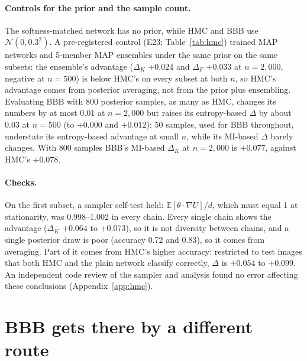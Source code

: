 \documentclass[10pt]{article}
\begin{document}
\paragraph{Controls for the prior and the sample count.} The softness-matched
network has no prior, while HMC and BBB use $\mathcal N(0,0.3^2)$. A pre-registered
control (E23; Table~\ref{tab:hmc}) trained MAP networks and 5-member MAP
ensembles under the same prior on the same subsets: the ensemble's advantage
($\Delta_K$ $+0.024$ and $\Delta_F$ $+0.033$ at $n=2{,}000$, negative at $n=500$) is
below HMC's on every subset at both $n$, so HMC's advantage comes from posterior
averaging, not from the prior plus ensembling. Evaluating BBB with 800
posterior samples, as many as HMC, changes its numbers by at most 0.01 at
$n=2{,}000$ but raises its entropy-based $\Delta$ by about 0.03 at $n=500$ (to
$+0.000$ and $+0.012$); 50 samples, used for BBB throughout, understate its
entropy-based advantage at small $n$, while its MI-based $\Delta$ barely changes.
With 800 samples BBB's MI-based $\Delta_K$ at $n=2{,}000$ is $+0.077$, against
HMC's $+0.078$.

\paragraph{Checks.} On the first subset, a sampler self-test held:
$\mathbb E[\theta\cdot\nabla U]/d$, which must equal 1 at stationarity, was
0.998--1.002 in every chain. Every single chain shows the advantage
($\Delta_K$ $+0.064$ to $+0.073$), so it is not diversity between chains, and a
single posterior draw is poor (accuracy 0.72 and 0.83), so it comes from
averaging. Part of it comes from HMC's higher accuracy: restricted to test
images that both HMC and the plain network classify correctly, $\Delta$ is
$+0.054$ to $+0.099$. An independent code review of the sampler and analysis
found no error affecting these conclusions (Appendix~\ref{app:hmc}).

\section{BBB gets there by a different route}\label{sec:route}
\end{document}
